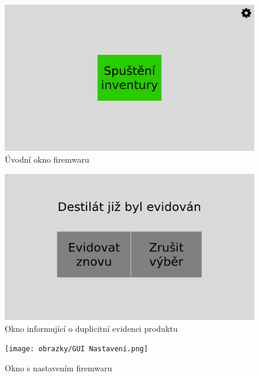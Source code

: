 \begin{figure}[!h]
    \begin{center}
        \includegraphics[scale=0.4]{obrazky/GUI Spuštění inventury.png}
    \end{center}
    \caption{Úvodní okno firemwaru}
    \label{Úvodní okno aplikace}
\end{figure}

\begin{figure}[H]
    \begin{center}
        \includegraphics[scale=0.4]{obrazky/GUI Duplicidita.png}
    \end{center}
    \caption{Okno informující o duplicitní evidenci produktu}
    \label{Okno informující o duplicitní evidenci produktu}
\end{figure}

\begin{figure}[H]
    \begin{center}
        \texttt{[image: obrazky/GUI Nastavení.png]}
    \end{center}
    \caption{Okno s nastavením firemwaru}
    \label{Okno s nastavením aplikace}
\end{figure}

